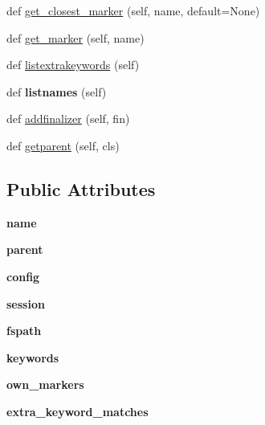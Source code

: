 \begin{DoxyCompactItemize}
\item 
def \hyperlink{class__pytest_1_1nodes_1_1_node_ae23b659185aada70e62911d02763decc}{get\+\_\+closest\+\_\+marker} (self, name, default=None)
\item 
def \hyperlink{class__pytest_1_1nodes_1_1_node_ae2b2c85b2d9fabc5f96c1b992774e5c9}{get\+\_\+marker} (self, name)
\item 
def \hyperlink{class__pytest_1_1nodes_1_1_node_abd89ec1da759bf88a82025cf125a7b14}{listextrakeywords} (self)
\item 
\mbox{\label{class__pytest_1_1nodes_1_1_node_a063cd9ec814d49e7569757375c756eb7}} 
def {\bfseries listnames} (self)
\item 
def \hyperlink{class__pytest_1_1nodes_1_1_node_a7cd4d492cfe9587ec3e2115a3aba47f5}{addfinalizer} (self, fin)
\item 
def \hyperlink{class__pytest_1_1nodes_1_1_node_a229a78c0bd7a10e8acebe1fe037d2a91}{getparent} (self, cls)
\end{DoxyCompactItemize}
\subsection*{Public Attributes}
\begin{DoxyCompactItemize}
\item 
\mbox{\label{class__pytest_1_1nodes_1_1_node_aff0a9d7507a8c2e9bbf9775b1b923bd0}} 
{\bfseries name}
\item 
\mbox{\label{class__pytest_1_1nodes_1_1_node_a55433d45ce825f07844cd7c121d72285}} 
{\bfseries parent}
\item 
\mbox{\label{class__pytest_1_1nodes_1_1_node_a7a9a764ca0de48a094445686e95cfdc8}} 
{\bfseries config}
\item 
\mbox{\label{class__pytest_1_1nodes_1_1_node_a85aed6e3d915e6895e25c34f23f1d793}} 
{\bfseries session}
\item 
\mbox{\label{class__pytest_1_1nodes_1_1_node_a555b9aaa16272517c9f40a316efabc92}} 
{\bfseries fspath}
\item 
\mbox{\label{class__pytest_1_1nodes_1_1_node_a862bc00b72fdf2a52ed87e50a92095e7}} 
{\bfseries keywords}
\item 
\mbox{\label{class__pytest_1_1nodes_1_1_node_aefeceae44c5a05980e6b49ed4d30c352}} 
{\bfseries own\+\_\+markers}
\item 
\mbox{\label{class__pytest_1_1nodes_1_1_node_a6faebba3aa9694892f3e28344a3191de}} 
{\bfseries extra\+\_\+keyword\+\_\+matches}
\end{DoxyCompactItemize}
